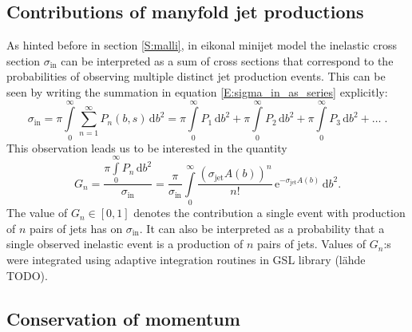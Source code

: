 \documentclass[a4paper, twoside, english, 12pt]{article}
\begin{document}
\subsection{Contributions of manyfold jet productions}\label{SS:multiple_jets}

As hinted before in section \ref{S:malli}, in eikonal minijet model the inelastic cross section $\sigma_{\text{in}}$ can be interpreted as a sum of cross sections that correspond to the probabilities of observing multiple distinct jet production events. This can be seen by writing the summation in equation \eqref{E:sigma_in_as_series} explicitly:
\begin{equation}
	\sigma_\text{in} =  \pi\int\limits_0^\infty \sum\limits_{n=1}^\infty P_n(b,s)\, \text{d}b^2 = \pi\int\limits_0^\infty P_1\, \text{d}b^2 + \pi\int\limits_0^\infty P_2\, \text{d}b^2 + \pi\int\limits_0^\infty P_3\, \text{d}b^2 +\ldots \; .
\end{equation}
This observation leads us to be interested in the quantity
\begin{equation}\label{E:manyfold_scatt_prob}
	G_n = \frac{\pi\int\limits_0^\infty P_n\, \text{d}b^2}{\sigma_\text{in}} = \frac{\pi}{\sigma_\text{in}}\int\limits_0^\infty \frac{(\sigma_\text{jet}A(b))^n}{n!}\,\text{e}^{-\sigma_\text{jet}A(b)} \, \text{d}b^2.
\end{equation}
The value of $G_n\in [0,1]$ denotes the contribution a single event with production of $n$ pairs of jets has on $\sigma_\text{in}$. It can also be interpreted as a probability that a single observed inelastic event is a production of $n$ pairs of jets. Values of $G_n$:s were integrated using adaptive integration routines in GSL library (lähde TODO).



\subsection{Conservation of momentum}\label{SS:MC}
\end{document}
